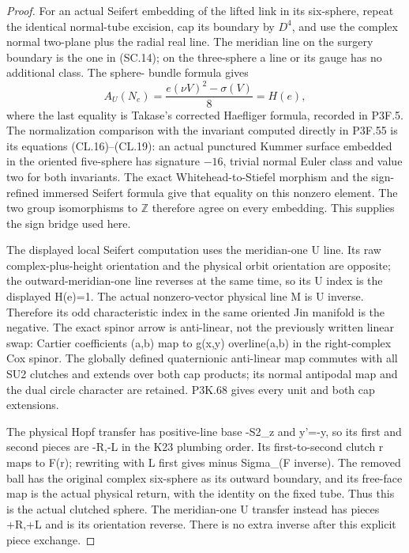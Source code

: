 \begin{proof}
For an actual Seifert embedding of the lifted link in its six-sphere,
repeat the identical normal-tube excision, cap its boundary by \(D^4\),
and use the complex normal two-plane plus the radial real line. The
meridian line on the surgery boundary is the one in (SC.14); on the
three-sphere a line or its gauge has no additional class. The sphere-
bundle formula gives
\[
 A_U(N_e)=\frac{e(\nu V)^2-\sigma(V)}8
                      =H(e),                        \tag{SC.18}
\]
where the last equality is Takase's corrected Haefliger formula,
recorded in P3F.5. The normalization comparison with the invariant
computed directly in P3F.55 is its equations (CL.16)--(CL.19): an
actual punctured Kummer surface embedded in the oriented five-sphere
has signature \(-16\), trivial normal Euler class and value two
for both invariants. The exact Whitehead-to-Stiefel morphism and the
sign-refined immersed Seifert formula give that equality on this
nonzero element. The two group isomorphisms to \(\mathbb Z\)
therefore agree on every embedding. This supplies the sign bridge
used here.

The displayed local Seifert computation uses the meridian-one U
line. Its raw complex-plus-height orientation and the physical orbit
orientation are opposite; the outward-meridian-one line reverses at
the same time, so its U index is the displayed H(e)=1. The actual
nonzero-vector physical line M is U inverse. Therefore its odd
characteristic index in the same oriented Jin manifold is the negative.
The exact spinor arrow is anti-linear, not the previously written
linear swap: Cartier coefficients (a,b) map to g(x,y) overline(a,b)
in the right-complex Cox spinor. The globally defined quaternionic
anti-linear map commutes with all SU2 clutches and extends over both
cap products; its normal antipodal map and the dual circle character
are retained. P3K.68 gives every unit and both cap extensions.

The physical Hopf transfer has positive-line base -S2\_z and y'=-y,
so its first and second pieces are -R,-L in the K23 plumbing order.
Its first-to-second clutch r maps to F(r); rewriting with L first
gives minus Sigma\_(F inverse). The removed ball has the original
complex six-sphere as its outward boundary, and its free-face map is
the actual physical return, with the identity on the fixed tube.
Thus this is the actual clutched sphere. The meridian-one U transfer
instead has pieces +R,+L and is its orientation reverse. There is
no extra inverse after this explicit piece exchange.


\end{proof}
